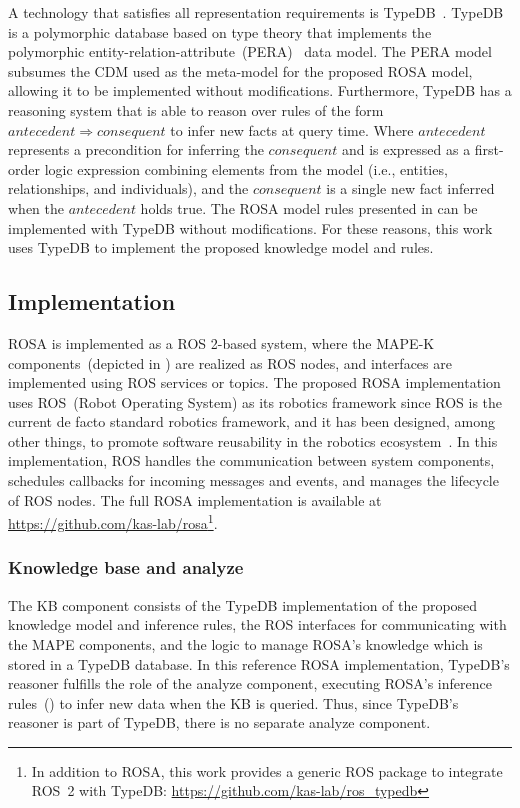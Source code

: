 A technology that satisfies all representation requirements is TypeDB~\citep{dorn2023type, typeql}. TypeDB is a polymorphic database based on type theory that implements the polymorphic entity-relation-attribute~(PERA)~\cite{typeql} data model. The PERA model subsumes the CDM used as the meta-model for the proposed ROSA model, allowing it to be implemented without modifications. Furthermore, TypeDB has a reasoning system that is able to reason over rules of the form $ antecedent \Rightarrow consequent$ to infer new facts at query time. Where $antecedent$ represents a precondition for inferring the $consequent$ and is expressed as a first-order logic expression combining elements from the model (i.e., entities, relationships, and individuals), and the $consequent$ is a single new fact inferred when the $antecedent$ holds true. The ROSA model rules presented in  can be implemented with TypeDB without modifications. For these reasons, this work uses TypeDB to implement the proposed knowledge model and rules.

\subsection{Implementation}\label{sec:rosa:impl}

ROSA is implemented as a ROS 2-based system, where the MAPE-K components~(depicted in ) are realized as ROS nodes, and interfaces are implemented using ROS services or topics. The proposed ROSA implementation uses ROS~(Robot Operating System) as its robotics framework since ROS is the current de facto standard robotics framework, and it has been designed, among other things, to promote software reusability in the robotics ecosystem~\cite{ros2}. In this implementation, ROS handles the communication between system components, schedules callbacks for incoming messages and events, and manages the lifecycle of ROS nodes.
The full ROSA implementation is available at \url{https://github.com/kas-lab/rosa}\footnote{In addition to ROSA, this work provides a generic ROS package to integrate ROS~2 with TypeDB\@: \url{https://github.com/kas-lab/ros_typedb}}.

\subsubsection{Knowledge base and analyze}
The KB component consists of the TypeDB implementation of the proposed knowledge model and inference rules, the ROS interfaces for communicating with the MAPE components, and the logic to manage ROSA's knowledge which is stored in a TypeDB database. In this reference ROSA implementation, TypeDB's reasoner fulfills the role of the analyze component, executing ROSA's inference rules~() to infer new data when the KB is queried. Thus, since TypeDB's reasoner is part of TypeDB, there is no separate analyze component.


